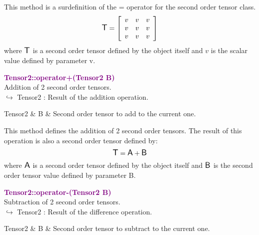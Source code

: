This method is a surdefinition of the = operator for the second order tensor class.
\begin{equation*}
\mbox{\large\ensuremath{\mathsf{T}}}=\left[\begin{array}{ccc}
v & v & v\\
v & v & v\\
v & v & v
\end{array}\right]
\end{equation*}
where $\mbox{\large\ensuremath{\mathsf{T}}}$ is a second order tensor defined by the object itself and $v$ is the scalar value defined by parameter v.

\textcolor{purple}{\textbf{Tensor2::operator+(Tensor2 B)}}\label{Tensor2::operator+(Tensor2 B)}\\
Addition of 2 second order tensors.\\ \hspace*{10mm}$\hookrightarrow$ Tensor2 : Result of the addition operation.

\begin{tcolorbox}[width=\textwidth,myArgs,tabularx={ll|R}]
Tensor2 & B & Second order tensor to add to the current one.
\end{tcolorbox}

This method defines the addition of 2 second order tensors.
The result of this operation is also a second order tensor defined by:
\begin{equation*}
\mbox{\large\ensuremath{\mathsf{T}}} = \mbox{\large\ensuremath{\mathsf{A}}} + \mbox{\large\ensuremath{\mathsf{B}}}
\end{equation*}
where $\mbox{\large\ensuremath{\mathsf{A}}}$ is a second order tensor defined by the object itself and $\mbox{\large\ensuremath{\mathsf{B}}}$ is the second order tensor value defined by parameter B.

\textcolor{purple}{\textbf{Tensor2::operator-(Tensor2 B)}}\label{Tensor2::operator-(Tensor2 B)}\\
Subtraction of 2 second order tensors.\\ \hspace*{10mm}$\hookrightarrow$ Tensor2 : Result of the difference operation.

\begin{tcolorbox}[width=\textwidth,myArgs,tabularx={ll|R}]
Tensor2 & B & Second order tensor to subtract to the current one.
\end{tcolorbox}

